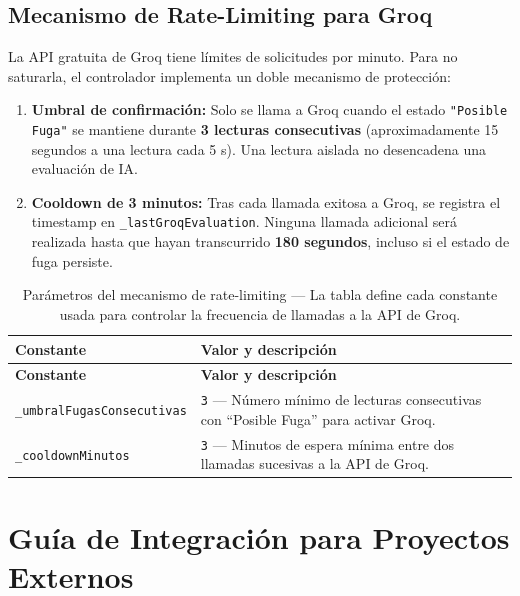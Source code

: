 \documentclass[12pt,a4paper]{article}
\begin{document}
\subsection{Mecanismo de Rate-Limiting para Groq}

La API gratuita de Groq tiene límites de solicitudes por minuto. Para no saturarla,
el controlador implementa un doble mecanismo de protección:

\begin{enumerate}[leftmargin=2em]
  \item \textbf{Umbral de confirmación:} Solo se llama a Groq cuando el estado
        \texttt{"Posible Fuga"} se mantiene durante \textbf{3 lecturas consecutivas}
        (aproximadamente 15 segundos a una lectura cada 5 s). Una lectura aislada
        no desencadena una evaluación de IA.

  \item \textbf{Cooldown de 3 minutos:} Tras cada llamada exitosa a Groq, se registra
        el timestamp en \texttt{\_lastGroqEvaluation}. Ninguna llamada adicional será
        realizada hasta que hayan transcurrido \textbf{180 segundos}, incluso si el
        estado de fuga persiste.
\end{enumerate}

\begin{longtable}{p{4.5cm} p{9cm}}
\caption{Parámetros del mecanismo de rate-limiting --- La tabla define cada constante
  usada para controlar la frecuencia de llamadas a la API de Groq.}
\label{tab:rate-limit} \\
\toprule
\textbf{Constante} & \textbf{Valor y descripción} \\
\midrule
\endfirsthead
\toprule
\textbf{Constante} & \textbf{Valor y descripción} \\
\midrule
\endhead
\bottomrule
\endlastfoot
\texttt{\_umbralFugasConsecutivas} & \texttt{3} --- Número mínimo de lecturas
  consecutivas con ``Posible Fuga'' para activar Groq. \\[0.5em]
\texttt{\_cooldownMinutos} & \texttt{3} --- Minutos de espera mínima entre dos
  llamadas sucesivas a la API de Groq. \\
\end{longtable}

\section{Guía de Integración para Proyectos Externos}
\end{document}
